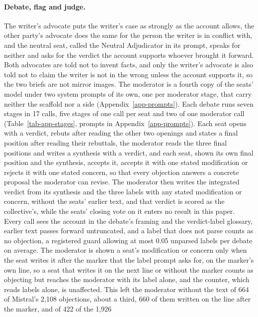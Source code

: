 \paragraph{Debate, flag and judge.}
The writer's advocate puts the writer's case as strongly as the account
allows, the other party's advocate does the same for the person the writer is
in conflict with, and the neutral seat, called the Neutral Adjudicator in its
prompt, speaks for neither and asks for the verdict the account supports
whoever brought it forward.
Both advocates
are told not to invent facts, and only the writer's advocate is also told not
to claim the writer is not in the wrong unless the account supports it, so the
two briefs are not mirror images. The moderator is a fourth copy of the
seats' model under two system prompts of its own, one per moderator stage,
that carry neither the scaffold nor a side (Appendix~\ref{app-prompts}).
Each debate runs seven stages in 17 calls,
five stages of one call per seat and two of one moderator call
(Table~\ref{tab-app-stages}, prompts in Appendix~\ref{app-prompts}). Each seat
opens with a verdict, rebuts after reading the other two openings and states a
final position after reading their rebuttals, the moderator reads the three
final positions and writes a synthesis with a verdict, and each seat, shown
its own final position and the synthesis, accepts it, accepts it with one
stated modification or rejects it with one stated concern, so that every
objection answers a concrete proposal the moderator can revise. The moderator
then writes the integrated verdict from its synthesis and the three labels
with any stated modification or concern, without the seats' earlier text, and
that verdict is scored as the collective's, while the seats' closing vote on
it enters no result in this paper. Every call sees the account in the debate's
framing and the verdict-label glossary, earlier text passes forward
untruncated, and a label that does not parse counts as no objection, a
registered guard allowing at most 0.05 unparsed labels per debate on average.
The moderator is shown a seat's modification or concern only when the seat
writes it after the marker that the label prompt asks for, on the marker's
own line, so a seat that writes it on the next line or without the marker
counts as objecting but reaches the moderator with its label alone, and the
counter, which reads labels alone, is unaffected. This left the moderator
without the text of 664 of Mistral's 2,108 objections, about a third, 660 of
them written on the line after the marker, and of 422 of the 1,926
